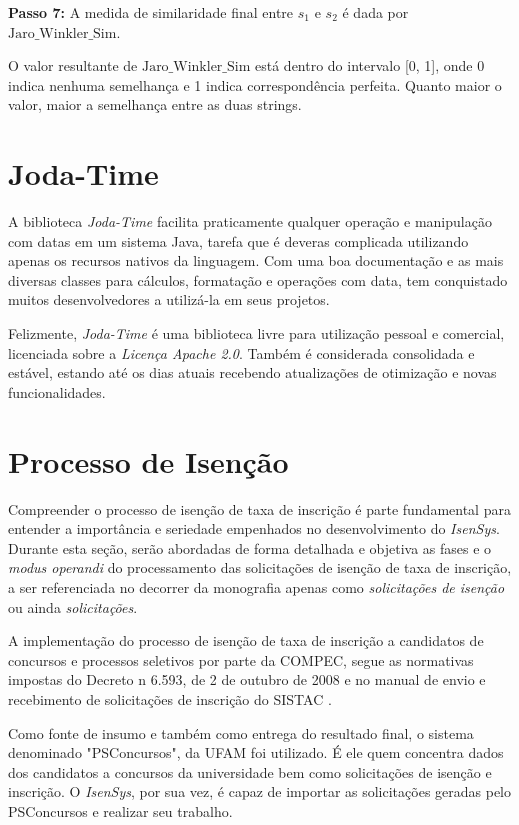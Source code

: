 \documentclass[
	12pt,			%
	openright,		%
	oneside,	
	a4paper,		%
	english,		%
	brazil			%
]{abntex2/abntex2}  %
\begin{document}
			\noindent
			\textbf{Passo 7:} A medida de similaridade final entre $s_1$ e $s_2$ é dada por $\text{Jaro\_Winkler\_Sim}$.
			
			O valor resultante de $\text{Jaro\_Winkler\_Sim}$ está dentro do intervalo [0, 1], onde 0 indica nenhuma semelhança e 1 indica correspondência perfeita. Quanto maior o valor, maior a semelhança entre as duas strings.
			
		\section{Joda-Time}
			
			A biblioteca \textit{Joda-Time} \cite{joda-time} facilita praticamente qualquer operação e manipulação com datas em um sistema Java, tarefa que é deveras complicada utilizando apenas os recursos nativos da linguagem. Com uma boa documentação e as mais diversas classes para cálculos, formatação e operações com data, tem conquistado muitos desenvolvedores a utilizá-la em seus projetos.
			
			Felizmente, \textit{Joda-Time} é uma biblioteca livre para utilização pessoal e comercial, licenciada sobre a \textit{Licença Apache 2.0}. Também é considerada consolidada e estável, estando até os dias atuais recebendo atualizações de otimização e novas funcionalidades.

		\section{Processo de Isenção} \label{isencao}
		
			Compreender o processo de isenção de taxa de inscrição é parte fundamental para entender a importância e seriedade empenhados no desenvolvimento do \textit{IsenSys}. Durante esta seção, serão abordadas de forma detalhada e objetiva as fases e o \textit{modus operandi} do processamento das solicitações de isenção de taxa de inscrição, a ser referenciada no decorrer da monografia apenas como \textit{solicitações de isenção} ou ainda \textit{solicitações}.
		
			A implementação do processo de isenção de taxa de inscrição a candidatos de concursos e processos seletivos por parte da COMPEC, segue as normativas impostas do Decreto n{\textordmasculine} 6.593, de 2 de outubro de 2008 \cite{cadunico-decreto} e no manual de envio e recebimento de solicitações de inscrição do SISTAC \cite{sistac-formatos}.
			
			Como fonte de insumo e também como entrega do resultado final, o sistema denominado "PSConcursos", da UFAM foi utilizado. É ele quem concentra dados dos candidatos a concursos da universidade bem como solicitações de isenção e inscrição. O \textit{IsenSys}, por sua vez, é capaz de importar as solicitações geradas pelo PSConcursos e realizar seu trabalho.
			
\end{document}
